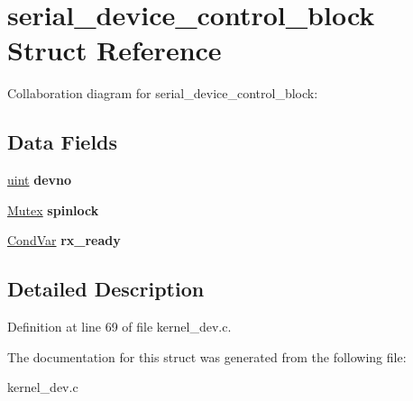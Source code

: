 \hypertarget{structserial__device__control__block}{}\section{serial\+\_\+device\+\_\+control\+\_\+block Struct Reference}
\label{structserial__device__control__block}


Collaboration diagram for serial\+\_\+device\+\_\+control\+\_\+block\+:
\subsection*{Data Fields}
\begin{DoxyCompactItemize}
\item 
\mbox{\label{structserial__device__control__block_a44ef944c9ed235eff02cba42f44487c6}} 
\hyperlink{bios_8h_a91ad9478d81a7aaf2593e8d9c3d06a14}{uint} {\bfseries devno}
\item 
\mbox{\label{structserial__device__control__block_a8861a6dc00a780bf5641f6945bf276cc}} 
\hyperlink{group__syscalls_gaef2ec62cae8e0031fd19fc8b91083ade}{Mutex} {\bfseries spinlock}
\item 
\mbox{\label{structserial__device__control__block_a2b0916cc5b259d64ebe85743ab89b84e}} 
\hyperlink{structCondVar}{Cond\+Var} {\bfseries rx\+\_\+ready}
\end{DoxyCompactItemize}


\subsection{Detailed Description}


Definition at line 69 of file kernel\+\_\+dev.\+c.



The documentation for this struct was generated from the following file\+:\begin{DoxyCompactItemize}
\item 
kernel\+\_\+dev.\+c\end{DoxyCompactItemize}
